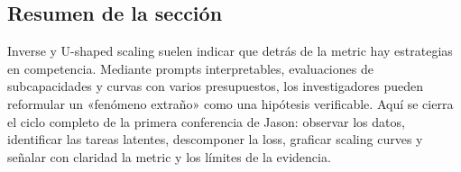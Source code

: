 
\subsection{Resumen de la sección}

Inverse y U-shaped scaling suelen indicar que detrás de la metric hay estrategias en competencia. Mediante prompts interpretables, evaluaciones de subcapacidades y curvas con varios presupuestos, los investigadores pueden reformular un «fenómeno extraño» como una hipótesis verificable. Aquí se cierra el ciclo completo de la primera conferencia de Jason: observar los datos, identificar las tareas latentes, descomponer la loss, graficar scaling curves y señalar con claridad la metric y los límites de la evidencia.

